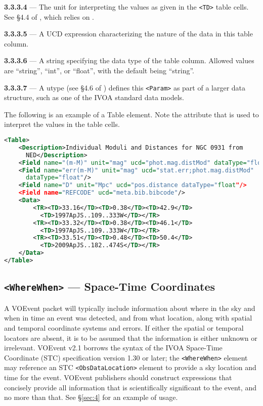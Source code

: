 \documentclass[11pt,a4paper]{ivoa}
\begin{document}
\noindent \textbf{3.3.3.4} \label{sec:3.3.3.4} --- The unit for
interpreting the values as given in the \verb|<TD>| table cells. See \S4.4 of
\citep{2019ivoa.spec.1021O}, which relies on \citep{2023ivoa.spec.1215G}. 

\noindent \textbf{3.3.3.5} \label{sec:3.3.3.5} --- A UCD
\citep{2018ivoa.spec.0527P} expression characterizing the nature of the data in
this table column.

\noindent \textbf{3.3.3.6} \label{sec:3.3.3.6} --- A string specifying
the data type of the table column. Allowed values are ``string'', ``int'', or
``float'', with the default being ``string''.

\noindent \textbf{3.3.3.7} \label{sec:3.3.3.7} --- A utype (see \S4.6 of
\citep{2019ivoa.spec.1021O}) defines this \verb|<Param>| as part of a larger data
structure, such as one of the IVOA standard data models.

 The following is an example of a Table element. Note the 
 attribute that is used to interpret the values in the table cells.
\begin{lstlisting}[language=XML]
<Table>
    <Description>Individual Moduli and Distances for NGC 0931 from
      NED</Description>
    <Field name="(m-M)" unit="mag" ucd="phot.mag.distMod" dataType="float"/>
    <Field name="err(m-M)" unit="mag" ucd="stat.err;phot.mag.distMod"
      dataType="float"/>
    <Field name="D" unit="Mpc" ucd="pos.distance dataType="float"/>
    <Field name="REFCODE" ucd="meta.bib.bibcode"/>
    <Data>
        <TR><TD>33.16</TD><TD>0.38</TD><TD>42.9</TD>
          <TD>1997ApJS..109..333W</TD></TR>
        <TR><TD>33.32</TD><TD>0.38</TD><TD>46.1</TD>
          <TD>1997ApJS..109..333W</TD></TR>
        <TR><TD>33.51</TD><TD>0.48</TD><TD>50.4</TD>
          <TD>2009ApJS..182..474S</TD></TR>
    </Data>
</Table>
\end{lstlisting}

\subsection{\texttt{<WhereWhen>} --- Space-Time Coordinates}
\label{sec:3.4}

A VOEvent packet will typically include information about where in the sky and
when in time an event was detected, and from what location, along with spatial
and temporal coordinate systems and errors. If either the spatial or temporal
locators are absent, it is to be assumed that the information is either unknown
or irrelevant. VOEvent v2.1 borrows the syntax of the IVOA Space-Time Coordinate
(STC) specification version 1.30 or later; the \verb|<WhereWhen>| element may
reference an STC \citep{2007ivoa.spec.1030R} \verb|<ObsDataLocation>| element to
provide a sky location and time for the event. VOEvent publishers should
construct expressions that concisely provide all information that is
scientifically significant to the event, and no more than that. See
\S\ref{sec:4} for an example of usage.
\end{document}

